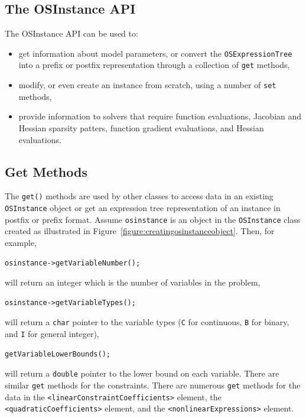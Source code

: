 \documentclass[11pt]{article}
\newcounter{Fig}
\renewcommand{\_}{{\char"5F}}
\renewcommand{\{}{{\char"7B}}
\renewcommand{\}}{{\char"7D}}
\renewcommand{\^}{{\char"0D}}
\renewcommand{\'}{{\char"0D}}
\begin{document}
\begin{enumerate}[Step 1:]
\section{The  OSInstance API}\label{section:osinstanceAPI}

The OSInstance API can be used to:

\begin{itemize}

\item  get information about model parameters, or convert the {\tt OSExpressionTree} into a prefix or postfix
representation through a collection  of {\tt get} methods,

\item modify, or even create an instance from scratch, using a number of {\tt set} methods,

\item provide information to solvers that require function evaluations, Jacobian and Hessian sparsity patters,  
function gradient evaluations, and Hessian evaluations.

\end{itemize}



\subsection{Get Methods}

The {\tt get()} methods are used by other classes to access data in an existing {\tt OSInstance} object or get 
an expression tree representation of an instance in postfix or prefix format.   Assume {\tt osinstance} is an 
object in the {\tt OSInstance} class created as illustrated in Figure~\ref{figure:creatingosinstanceobject}. 
Then, for example,
\begin{verbatim}
osinstance->getVariableNumber();
\end{verbatim}
will return an integer which is the number of variables in the problem,
\begin{verbatim}
osinstance->getVariableTypes();
\end{verbatim}
will return a {\tt char} pointer to the variable types ({\tt C} for continuous, {\tt B} for binary, 
and {\tt I} for general integer),
\begin{verbatim}
getVariableLowerBounds();
\end{verbatim}
will  return a {\tt double} pointer to the lower bound on each variable. There are similar {\tt get} methods 
for the constraints. There are numerous {\tt get} methods for the data in the {\tt <linearConstraintCoefficients>} 
 element, the {\tt <quadraticCoefficients>} element, and the {\tt <nonlinearExpressions>} element.


\end{enumerate}
\end{document}
